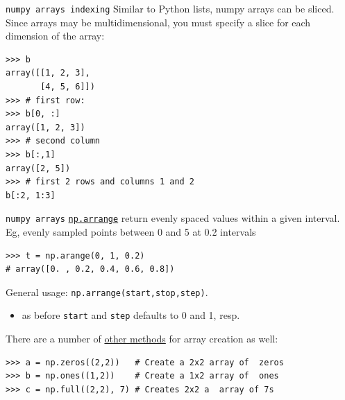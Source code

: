 \documentclass[xcolor=svgnames, handout]{beamer}
\newcommand{\nl}{\\[1em]}
\begin{document}
\begin{frame}[fragile]{\tt numpy arrays indexing}
Similar to Python lists, numpy arrays can be sliced. Since arrays may be multidimensional, you must specify a slice for each dimension of the array:
\begin{Verbatim}[frame=single]
>>> b
array([[1, 2, 3],
       [4, 5, 6]])
>>> # first row:
>>> b[0, :]
array([1, 2, 3])
>>> # second column
>>> b[:,1]
array([2, 5])
>>> # first 2 rows and columns 1 and 2
b[:2, 1:3]
\end{Verbatim}

\end{frame}




\begin{frame}[fragile]{\tt numpy arrays}
\href{https://docs.scipy.org/doc/numpy/reference/generated/numpy.arange.html\#numpy.arange}{\tt np.arrange} return evenly spaced values within a given interval.  Eg, evenly sampled points between 0 and 5 at 0.2 intervals
\begin{Verbatim}[frame=single]
>>> t = np.arange(0, 1, 0.2)
# array([0. , 0.2, 0.4, 0.6, 0.8])
\end{Verbatim}
General usage: {\tt np.arrange(start,stop,step)}.
\begin{itemize}
\item  as before {\tt start} and {\tt step} defaults to 0 and 1, resp.\nl
\end{itemize}


There are a number of  \href{https://docs.scipy.org/doc/numpy/user/basics.creation.html\#arrays-creation}{other methods} for array creation as well:
\begin{Verbatim}
>>> a = np.zeros((2,2))   # Create a 2x2 array of  zeros
>>> b = np.ones((1,2))    # Create a 1x2 array of  ones
>>> c = np.full((2,2), 7) # Creates 2x2 a  array of 7s
\end{Verbatim}

\end{frame}
\end{document}

